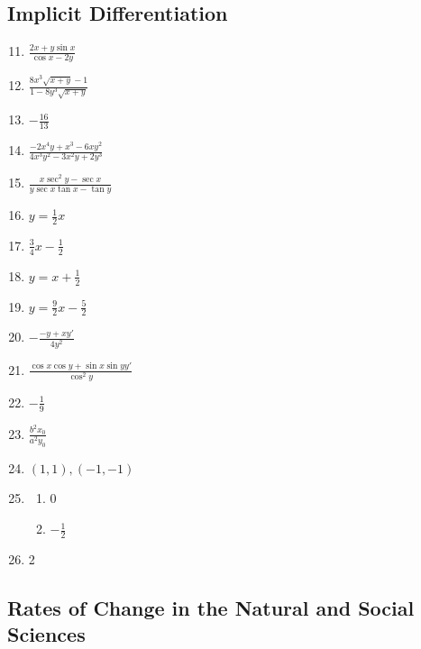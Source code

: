 \documentclass{article}
\begin{document}
\subsection{Implicit Differentiation}
\begin{enumerate}
    \setcounter{enumi}{10}
  \item $\frac{2x+y\sin{x}}{\cos{x}-2y}$
    \setcounter{enumi}{12}
  \item $\frac{8x^3\sqrt{x+y}-1}{1-8y^3\sqrt{x+y}}$
    \setcounter{enumi}{20}
  \item $-\frac{16}{13}$
    \setcounter{enumi}{22}
  \item $\frac{-2x^4y+x^3-6xy^2}{4x^3y^2-3x^2y+2y^3}$
  \item $\frac{x\sec^2y-\sec{x}}{y\sec{x}\tan{x}-\tan{y}}$
  \item $y=\frac{1}{2}x$
    \setcounter{enumi}{26}
  \item $\frac{3}{4}x -\frac{1}{2}$
    \setcounter{enumi}{28}
  \item $y=x+\frac{1}{2}$
    \setcounter{enumi}{32}
  \item $y=\frac{9}{2}x-\frac{5}{2}$
    \setcounter{enumi}{34}
  \item $-\frac{-y+xy'}{4y^2}$
    \setcounter{enumi}{36}
  \item $\frac{\cos{x}\cos{y}+\sin{x}\sin{y}y'}{\cos^2y}$
    \setcounter{enumi}{38}
  \item $-\frac{1}{9}$
    \setcounter{enumi}{44}
  \item $\frac{b^2x_0}{a^2y_0}$
    \setcounter{enumi}{58}
  \item $(1, 1), (-1, -1)$
    \setcounter{enumi}{60}
  \item
    \begin{enumerate}
      \item 0
      \item $-\frac{1}{2}$
    \end{enumerate}
  \item 2
\end{enumerate}

\subsection{Rates of Change in the Natural and Social Sciences}
\end{document}
